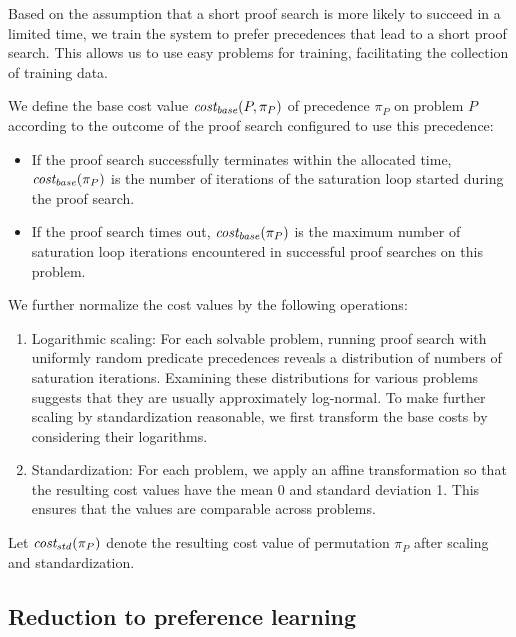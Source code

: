 Based on the assumption that a short proof search is more likely to succeed in a limited time\cite{?},
we train the system to prefer precedences that lead to a short proof search.
This allows us to use easy problems for training, facilitating the collection of training data.

We define the base cost
value \(\operatorname{\mathit{cost_{base}}}(P, \pi_P)\) of precedence \(\pi_P\) on problem \(P\)
according to the outcome of the proof search configured to use this precedence:

\begin{itemize}
	\item If the proof search successfully terminates within the allocated time,
	\(\operatorname{\mathit{cost_{base}}}(\pi_P)\) is the number of iterations of the saturation loop
	started during the proof search.
	\item If the proof search times out, \(\operatorname{\mathit{cost_{base}}}(\pi_P)\) is the maximum number
	of saturation loop iterations encountered in successful proof searches on this problem.
\end{itemize}

We further normalize the cost values by the following operations:

\begin{enumerate}
	\item Logarithmic scaling:
	For each solvable problem, running proof search with uniformly random predicate precedences
	reveals a distribution of numbers of saturation iterations.
	Examining these distributions for various problems suggests that they are usually
	approximately log-normal.
	To make further scaling by standardization reasonable,
	we first transform the base costs by considering their logarithms.
	\item Standardization\cite{?}:
	For each problem,
	we apply an affine transformation so that the resulting cost values
	have the mean 0 and standard deviation 1.
	This ensures that the values are comparable across problems.
\end{enumerate}

Let \(\operatorname{\mathit{cost_{std}}}(\pi_P)\) denote the resulting cost value of permutation \(\pi_P\)
after scaling and standardization.

\subsection{Reduction to preference learning}

